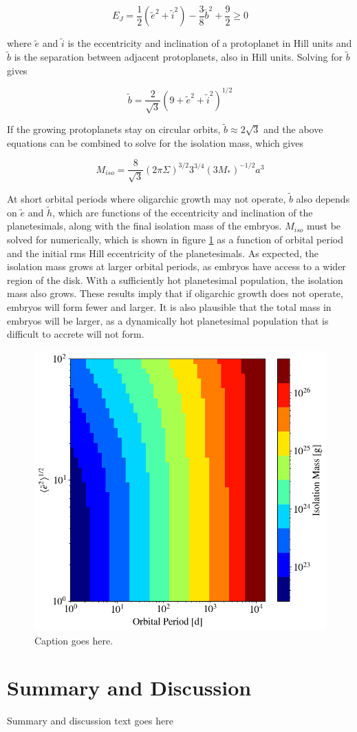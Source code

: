 \documentclass[onecolumn]{aastex63}
\begin{document}
\begin{equation}
    E_{J} = \frac{1}{2} \left( \tilde{e}^{2} + \tilde{i}^{2} \right) - \frac{3}{8} \tilde{b}^{2} + \frac{9}{2}  \geq 0
\end{equation}

\noindent where $\tilde{e}$ and  $\tilde{i}$ is the eccentricity and inclination of a protoplanet in Hill units and $\tilde{b}$ is the separation between adjacent protoplanets, also in Hill units. Solving for $\tilde{b}$ gives

\begin{equation}
    \tilde{b} = \frac{2}{\sqrt{3}} \left( 9 + \tilde{e}^{2} + \tilde{i}^{2} \right)^{1/2}
\end{equation}

If the growing protoplanets stay on circular orbits, $\tilde{b} \approx 2 \sqrt{3}$ and the above equations can be combined to solve for the isolation mass, which gives

\begin{equation}
    M_{iso} = \frac{8}{\sqrt{3}} \left(2 \pi \Sigma \right)^{3/2} 3^{3/4} \left( 3 M_{*} \right)^{-1/2} a^{3}
\end{equation}

At short orbital periods where oligarchic growth may not operate, $\tilde{b}$ also depends on $\tilde{e}$ and $\tilde{h}$, which are functions of the eccentricity and inclination of the planetesimals, along with the final isolation mass of the embryos. $M_{iso}$ must be solved for numerically, which is shown in figure \ref{fig:m_iso} as a function of orbital period and the initial rms Hill eccentricity of the planetesimals.  As expected, the isolation mass grows at larger orbital periods, as embryos have access to a wider region of the disk. With a sufficiently hot planetesimal population, the isolation mass also grows. These results imply that if oligarchic growth does not operate, embryos will form fewer and larger. It is also plausible that the total mass in embryos will be larger, as a dynamically hot planetesimal population that is difficult to accrete will not form.

\begin{figure}
    \begin{center}
    \includegraphics[width=0.5\columnwidth]{figures/m_iso.png}
    \caption{Caption goes here.\label{fig:m_iso}}
    \end{center}
\end{figure}

\section{Summary and Discussion} \label{sec:discuss}

Summary and discussion text goes here



\clearpage
\end{document}
